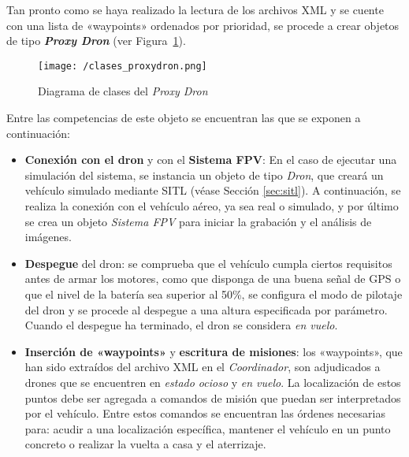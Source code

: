 Tan pronto como se haya realizado la lectura de los archivos XML y se cuente con una lista de «waypoints» ordenados por prioridad, se procede a crear objetos de tipo \textbf{\textit{Proxy Dron}} (ver Figura~\ref{fig:diagclasesproxy}). 

\begin{figure}[!h]
\begin{center}
\texttt{[image: /clases\_proxydron.png]}
\caption[Diagrama de clases del \textit{Proxy Dron}]{Diagrama de clases del \textit{Proxy Dron}}
\label{fig:diagclasesproxy}
\end{center}
\end{figure}

Entre las competencias de este objeto se encuentran las que se exponen a continuación:

\begin{itemize}
\item \textbf{Conexión con el dron} y con el \textbf{Sistema \acs{FPV}}: En el caso de ejecutar una simulación del sistema, se instancia un objeto de tipo \textit{Dron}, que creará un vehículo simulado mediante \acs{SITL} (véase Sección \ref{sec:sitl}). A continuación, se realiza la conexión con el vehículo aéreo, ya sea real o simulado, y por último se crea un objeto \textit{Sistema \acs{FPV}} para iniciar la grabación y el análisis de imágenes.
\item \textbf{Despegue} del dron: se comprueba que el vehículo cumpla ciertos requisitos antes de armar los motores, como que disponga de una buena señal de \acs{GPS} o que el nivel de la batería sea superior al 50\%, se configura el modo de pilotaje del dron y se procede al despegue a una altura especificada por parámetro. Cuando el despegue ha terminado, el dron se considera \textit{en vuelo}. 
\item \textbf{Inserción de «waypoints»} y \textbf{escritura de misiones}: los «waypoints», que han sido extraídos del archivo XML en el \textit{Coordinador}, son adjudicados a drones que se encuentren en \textit{estado ocioso} y \textit{en vuelo}. La localización de estos puntos debe ser agregada a comandos de misión que puedan ser interpretados por el vehículo. Entre estos comandos se encuentran las órdenes necesarias para: acudir a una localización específica, mantener el vehículo en un punto concreto o realizar la vuelta a casa y el aterrizaje.
\end{itemize}

